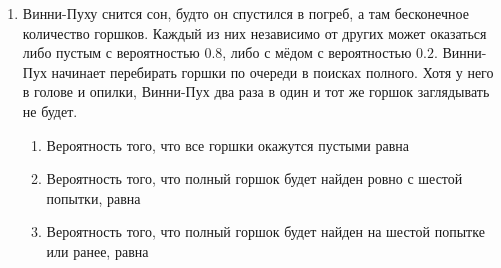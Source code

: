 \documentclass[12pt, a4paper]{article}\usepackage[]{graphicx}\usepackage[]{color}
\begin{document}
\begin{enumerate}

\item Винни-Пуху снится сон, будто он спустился в погреб, а там бесконечное количество горшков. Каждый из них независимо от других может оказаться либо пустым с вероятностью $0.8$, либо с мёдом с вероятностью $0.2$. Винни-Пух начинает перебирать горшки по очереди в поисках полного. Хотя у него в голове и опилки, Винни-Пух два раза в один и тот же горшок заглядывать не будет.
\begin{enumerate}
\item Вероятность того, что все горшки окажутся пустыми равна \underline{\hspace{2cm}}
\item Вероятность того, что полный горшок будет найден ровно с шестой попытки, равна \underline{\hspace{2cm}}
\item Вероятность того, что полный горшок будет найден на шестой попытке или ранее, равна \underline{\hspace{2cm}}
\end{enumerate}


\end{enumerate}
\end{document}
